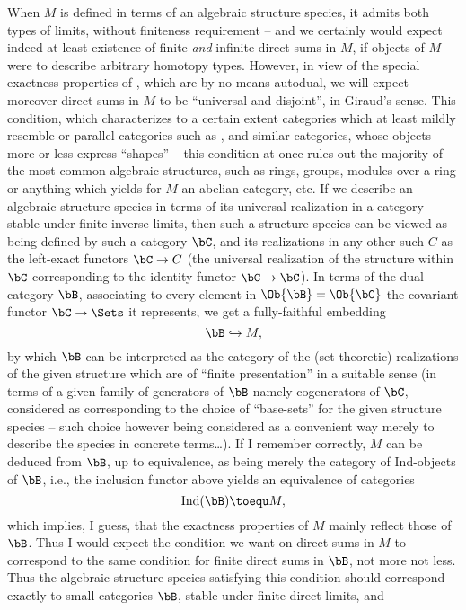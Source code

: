 When $M$ is defined in terms of an algebraic structure species,
it admits both types of limits, without finiteness
requirement -- and we certainly would expect indeed at least existence
of finite \emph{and} infinite direct sums in $M$, if objects of $M$
were to describe arbitrary homotopy types. However, in view of the
special exactness properties of \Hot{}, which are by no means autodual,
we will expect moreover direct sums in $M$ to be ``universal and
disjoint'', in Giraud's sense. This condition, which characterizes to
a certain extent categories which at least mildly resemble or parallel
categories such as \Sets, \Spaces{} and similar categories, whose
objects more or less express ``shapes'' -- this condition at once
rules out the majority of the most common algebraic structures, such
as rings, groups, modules over a ring or anything which yields for $M$
an abelian category, etc. If we describe an algebraic structure
species in terms of its universal realization in a category stable
under finite inverse limits, then such a structure species can be
viewed as being defined by such a category $\bC$, and its
realizations in any other such $C$ as the left-exact functors $\bC\to C$
(the universal realization of the structure within $\bC$
corresponding to the identity functor $\bC\to \bC$). In terms of
the dual category $\bB$, associating to every element in $\Ob{\bB}
= \Ob{\bC}$ the covariant functor $\bC\to\Sets$ it
represents, we get a fully-faithful embedding
\[\bB\hookrightarrow M,  \]
by which $\bB$ can be interpreted as the category of the
(set-theoretic) realizations of the given structure which are of
``finite presentation'' in a suitable sense (in terms of a given
family of generators of $\bB$ namely cogenerators of $\bC$,
considered as corresponding to the choice of ``base-sets'' for the
given structure species -- such choice however being considered as a
convenient way merely to describe the species in concrete terms\dots).
If I remember correctly, $M$ can be deduced from $\bB$, up to
equivalence, as being merely the category of Ind-objects of $\bB$,
i.e., the inclusion functor above yields an equivalence of categories
\[ \text{Ind}(\bB) \toequ M, \]
which implies, I guess, that the exactness properties of $M$ mainly
reflect those of $\bB$. Thus I would expect the condition we want
on direct sums in $M$ to correspond to the same condition for finite
direct sums in $\bB$, not more not less. Thus the algebraic
structure species satisfying this condition should correspond exactly
to small categories $\bB$, stable under finite direct limits, and
